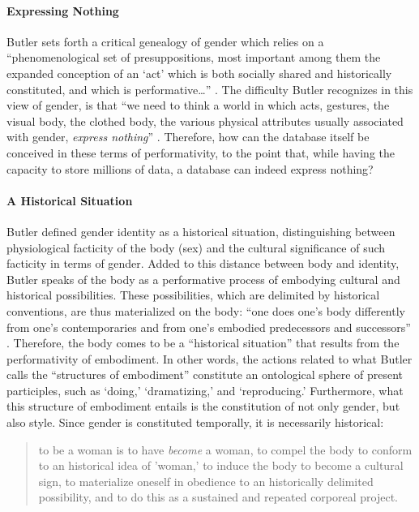 \paragraph{Expressing Nothing}
Butler sets forth a critical genealogy of gender which relies on a ``phenomenological set of presuppositions, most important among them the expanded conception of an `act' which is both socially shared and historically constituted, and which is performative\dots'' \parencite[530]{But88:Per}. The difficulty Butler recognizes in this view of gender, is that ``we need to think a world in which acts, gestures, the visual body, the clothed body, the various physical attributes usually associated with gender, \textit{express nothing}'' \parencite[530]{But88:Per}. Therefore, how can the database itself be conceived in these terms of performativity, to the point that, while having the capacity to store millions of data, a database can indeed express nothing? 

\paragraph{A Historical Situation}
Butler defined gender identity as a historical situation, distinguishing between physiological facticity of the body (sex) and the cultural significance of such facticity in terms of gender. Added to this distance between body and identity, Butler speaks of the body as a performative process of embodying cultural and historical possibilities. These possibilities, which are delimited by historical conventions, are thus materialized on the body: ``one does one's body differently from one's contemporaries and from one's embodied predecessors and successors'' \parencite[521]{But88:Per}. Therefore, the body comes to be a ``historical situation'' that results from the performativity of embodiment. In other words, the actions related to what Butler calls the ``structures of embodiment'' constitute an ontological sphere of present participles, such as `doing,' `dramatizing,' and `reproducing.' Furthermore, what this structure of embodiment entails is the constitution of not only gender, but also style. Since gender is constituted temporally, it is necessarily historical:

\begin{quote}
	to be a woman is to have \textit{become} a woman, to compel the body to conform to an historical idea of 'woman,' to induce the body to become a cultural sign, to materialize oneself in obedience to an historically delimited possibility, and to do this as a sustained and repeated corporeal project. \parencite[521]{But88:Per}
\end{quote}

